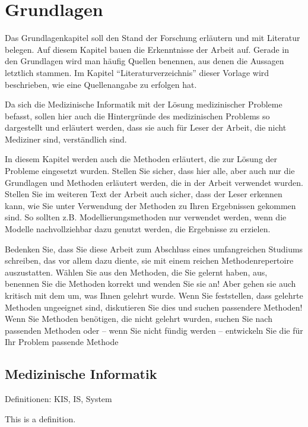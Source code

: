 \chapter{Grundlagen}\label{ch:preliminaries}

Das Grundlagenkapitel soll den Stand der Forschung erläutern und mit Literatur belegen.
Auf diesem Kapitel bauen die Erkenntnisse der Arbeit auf.
Gerade in den Grundlagen wird man häufig Quellen benennen, aus denen die Aussagen letztlich stammen.
Im Kapitel \enquote{Literaturverzeichnis} dieser Vorlage wird beschrieben, wie eine Quellenangabe zu erfolgen hat.

Da sich die Medizinische Informatik mit der Lösung medizinischer Probleme befasst, sollen hier auch die Hintergründe des medizinischen Problems so dargestellt und erläutert werden, dass sie auch für Leser der Arbeit, die nicht Mediziner sind, verständlich sind.

In diesem Kapitel werden auch die Methoden erläutert, die zur Lösung der Probleme eingesetzt wurden.
Stellen Sie sicher, dass hier alle, aber auch nur die Grundlagen und Methoden erläutert werden, die in der Arbeit verwendet wurden.
Stellen Sie im weiteren Text der Arbeit auch sicher, dass der Leser erkennen kann, wie Sie unter Verwendung der Methoden zu Ihren Ergebnissen gekommen sind.
So sollten z.B. Modellierungsmethoden nur verwendet werden, wenn die Modelle nachvollziehbar dazu genutzt werden, die Ergebnisse zu erzielen.

Bedenken Sie, dass Sie diese Arbeit zum Abschluss eines umfangreichen Studiums schreiben, das vor allem dazu diente, sie mit einem reichen Methodenrepertoire auszustatten.
Wählen Sie aus den Methoden, die Sie gelernt haben, aus, benennen Sie die Methoden korrekt und wenden Sie sie an! Aber gehen sie auch kritisch mit dem um, was Ihnen gelehrt wurde.
Wenn Sie feststellen, dass gelehrte Methoden ungeeignet sind, diskutieren Sie dies und suchen passendere Methoden! Wenn Sie Methoden benötigen, die nicht gelehrt wurden, suchen Sie nach passenden Methoden oder -- wenn Sie nicht fündig werden -- entwickeln Sie die für Ihr Problem passende Methode 

\section{Medizinische Informatik}\label{sec:mi}
Definitionen: KIS, IS, System
\begin{definition}[KIS]
  This is a definition.
\end{definition}

